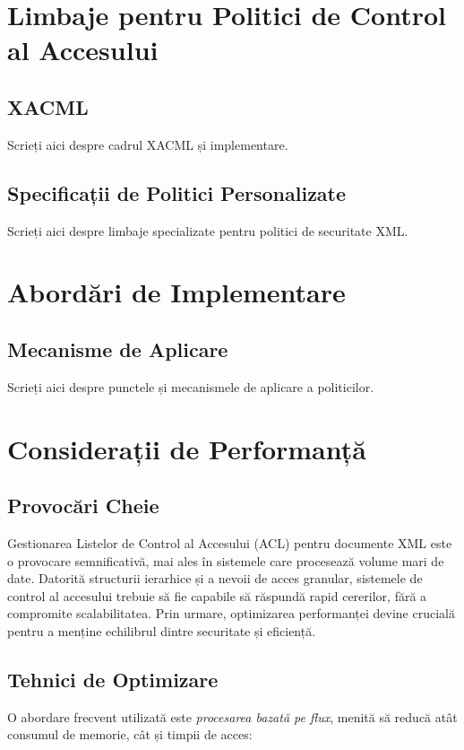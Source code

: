 \documentclass[runningheads]{llncs}
\begin{document}
\section{Limbaje pentru Politici de Control al Accesului}

\subsection{XACML}
Scrieți aici despre cadrul XACML și implementare.

\subsection{Specificații de Politici Personalizate}
Scrieți aici despre limbaje specializate pentru politici de securitate XML.

\section{Abordări de Implementare}

\subsection{Mecanisme de Aplicare}
Scrieți aici despre punctele și mecanismele de aplicare a politicilor.

\section{Considerații de Performanță}
\subsection{Provocări Cheie}

Gestionarea Listelor de Control al Accesului (ACL) pentru documente XML este o provocare semnificativă, mai ales în sistemele care procesează volume mari de date. Datorită structurii ierarhice și a nevoii de acces granular, sistemele de control al accesului trebuie să fie capabile să răspundă rapid cererilor, fără a compromite scalabilitatea. Prin urmare, optimizarea performanței devine crucială pentru a menține echilibrul dintre securitate și eficiență.

\subsection{Tehnici de Optimizare}

O abordare frecvent utilizată este \textit{procesarea bazată pe flux}, menită să reducă atât consumul de memorie, cât și timpii de acces:
\end{document}
